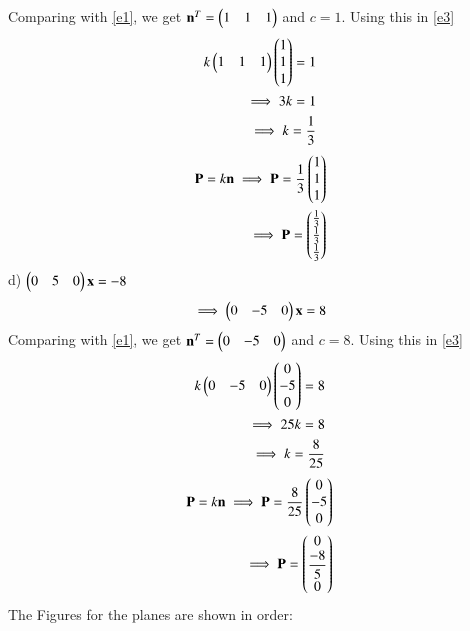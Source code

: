 \documentclass[journal,12pt,twocolumn]{IEEEtran}
\begin{document}
Comparing with \eqref{e1}, we get $\mathbf{n}^T = \begin{pmatrix}1&1&1\end{pmatrix}$ and  $c=1$. Using this in \eqref{e3}
\begin{align}
	k\begin{pmatrix}1&1&1\end{pmatrix}\begin{pmatrix}1\\1\\1\end{pmatrix} = 1\\
	\implies 3k = 1\\
	\implies k = \frac{1}{3}
\end{align}
\begin{align}
	\mathbf{P} = k\mathbf{n}
	\implies\mathbf{P} = \frac{1}{3}\begin{pmatrix}1\\1\\1\end{pmatrix}\\
	\implies\mathbf{P}= \begin{pmatrix}\frac{1}{3}\\\frac{1}{3}\\\frac{1}{3}\end{pmatrix}
\end{align}
d) $\begin{pmatrix}0&5&0\end{pmatrix}\mathbf{x} = -8$
\begin{align}
    \nonumber\implies\begin{pmatrix}0&-5&0\end{pmatrix}\mathbf{x} = 8
\end{align}
Comparing with \eqref{e1}, we get $\mathbf{n}^T = \begin{pmatrix}0&-5&0\end{pmatrix}$ and  $c=8$. Using this in \eqref{e3}
\begin{align}
	k\begin{pmatrix}0&-5&0\end{pmatrix}\begin{pmatrix}0\\-5\\0\end{pmatrix} = 8\\
	\implies 25k = 8\\
	\implies k = \frac{8}{25}
\end{align}
\begin{align}
	\mathbf{P} = k\mathbf{n}
	\implies\mathbf{P} = \frac{8}{25}\begin{pmatrix}0\\-5\\0\end{pmatrix}\\
	\implies\mathbf{P}= \begin{pmatrix}0\\\dfrac{-8}{5}\\0\end{pmatrix}
\end{align}
The Figures for the planes are shown in order:
\renewcommand{\thefigure}{a}
\end{document}
